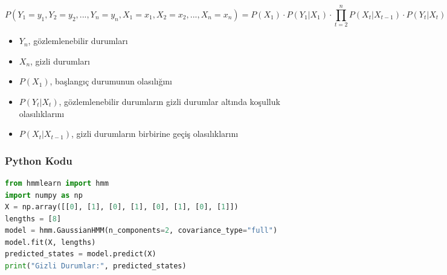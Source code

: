 \[P(Y_1=y_1, Y_2=y_2, ..., Y_n=y_n, X_1=x_1, X_2=x_2, ..., X_n=x_n) = P(X_1) \cdot P(Y_1|X_1) \cdot \prod_{t=2}^{n} P(X_t|X_{t-1}) \cdot P(Y_t|X_t)\]
\begin{itemize}
    \item $Y_{n}$, gözlemlenebilir durumları
    \item $X_{n}$, gizli durumları
    \item $P(X_1)$, başlangıç durumunun olasılığını
    \item $P(Y_{t} | X_{t})$, gözlemlenebilir durumların gizli durumlar altında koşulluk olasılıklarını
    \item $P(X_{t} | X_{t-1})$, gizli durumların birbirine geçiş olasılıklarını
\end{itemize}

\subsubsection{Python Kodu}

\begin{lstlisting}[language=Python]
from hmmlearn import hmm
import numpy as np
X = np.array([[0], [1], [0], [1], [0], [1], [0], [1]])
lengths = [8]
model = hmm.GaussianHMM(n_components=2, covariance_type="full")
model.fit(X, lengths)
predicted_states = model.predict(X)
print("Gizli Durumlar:", predicted_states)
\end{lstlisting}

\newpage